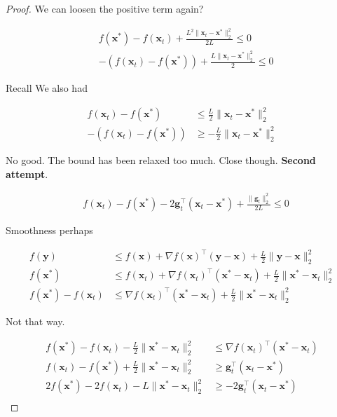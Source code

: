 \documentclass{article}
\begin{document}
\begin{proof}
	We can loosen the positive term again? 
	
	\begin{align}
		&  f(\mathbf{x^*}) - f(\mathbf{x}_t) +\frac{ L^2\|\mathbf{x}_t - \mathbf{x}^*\|^2_2}{2L} \le 0\\
		&  -(f(\mathbf{x}_t) - f(\mathbf{x^*})) +\frac{ L\|\mathbf{x}_t - \mathbf{x}^*\|^2_2}{2} \le 0
	\end{align}
	
	Recall We also had
	
	\begin{align}
		f(\mathbf{x}_t) -  f(\mathbf{x}^*) &\le \frac{L}{2}\|\mathbf{x}_t - \mathbf{x}^*\|^2_2\\
		-(f(\mathbf{x}_t) -  f(\mathbf{x}^*)) &\ge -\frac{L}{2}\|\mathbf{x}_t - \mathbf{x}^*\|^2_2
	\end{align}
	
	No good. The bound has been relaxed too much. Close though. \textbf{Second attempt}.
	
	\begin{align}
		&f(\mathbf{x}_t) - f(\mathbf{x}^*)  - 2 \mathbf{g}^\top_t(\mathbf{x}_t - \mathbf{x}^*) +\frac{\|\mathbf{g}_t\|^2_2}{2L} \le 0
	\end{align}
	
	Smoothness perhaps
	
	\begin{align}
		f(\mathbf{y}) &\le f(\mathbf{x}) + \nabla f(\mathbf{x})^\top (\mathbf{y}-\mathbf{x}) + \frac{L}{2}\|\mathbf{y}- \mathbf{x} \|^2_2\\
		f(\mathbf{x}^*) &\le f(\mathbf{x}_t) + \nabla f(\mathbf{x}_t)^\top (\mathbf{x}^*-\mathbf{x}_t) + \frac{L}{2}\|\mathbf{x}^* - \mathbf{x}_t \|^2_2\\
		f(\mathbf{x}^*) - f(\mathbf{x}_t) &\le  \nabla f(\mathbf{x}_t)^\top (\mathbf{x}^*-\mathbf{x}_t) + \frac{L}{2}\|\mathbf{x}^* - \mathbf{x}_t \|^2_2
	\end{align}
	
	Not that way. 
	
	\begin{align}
		f(\mathbf{x}^*) - f(\mathbf{x}_t) - \frac{L}{2}\|\mathbf{x}^* - \mathbf{x}_t \|^2_2 &\le  \nabla f(\mathbf{x}_t)^\top (\mathbf{x}^*-\mathbf{x}_t) \\
		f(\mathbf{x}_t) - f(\mathbf{x}^*)  + \frac{L}{2}\|\mathbf{x}^* - \mathbf{x}_t \|^2_2 &\ge \mathbf{g}_t^\top (\mathbf{x}_t - \mathbf{x}^*) \\
		2f(\mathbf{x}^*) - 2f(\mathbf{x}_t)   - L\|\mathbf{x}^* - \mathbf{x}_t \|^2_2 &\ge -2\mathbf{g}_t^\top (\mathbf{x}_t - \mathbf{x}^*) \\
	\end{align}
	

\end{proof}
\end{document}
